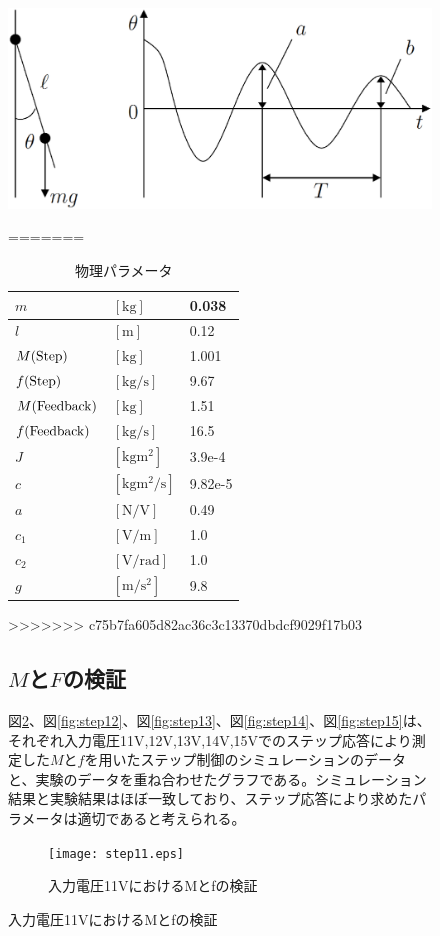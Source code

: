 \documentclass[a4j,11pt,twoside]{ujbook}
\begin{document}
\begin{figure}[htbp]
	\begin{center}
		\includegraphics[width = 0.7 \linewidth]{measure_jc.eps}
		\caption{振子の自由振動}
		\label{fig:振子の自由振動}
=======
\begin{table}[hbtp]
	\begin{center}
		\caption{物理パラメータ}
		\medskip
		\begin{tabular}{|ll|l|} \hline
			$m$ & $[\mathrm{kg}]$ & 0.038 \\ \hline
			$l$ & $[\mathrm{m}]$ & 0.12 \\ \hline
			$M(\rm{Step})$ & $[\mathrm{kg}]$ & 1.001 \\ \hline
			$f(\rm{Step})$ & $[\mathrm{kg/s}]$ & 9.67 \\ \hline
			$M(\rm{Feedback})$ & $[\mathrm{kg}]$ & 1.51 \\ \hline
			$f(\rm{Feedback})$ & $[\mathrm{kg/s}]$ & 16.5 \\ \hline
			$J$ & $[\mathrm{kgm^2}]$ & 3.9e-4 \\ \hline
			$c$ & $[\mathrm{kgm^2/s}]$ & 9.82e-5 \\ \hline
			$a$ & $[\mathrm{N/V}]$ & 0.49 \\ \hline
			$c_1$ & $[\mathrm{V/m}]$ & 1.0 \\ \hline
			$c_2$ & $[\mathrm{V/rad}]$ & 1.0 \\ \hline
			$g$ & $[\mathrm{m/s^2}]$ & 9.8 \\ \hline
		\end{tabular}
>>>>>>> c75b7fa605d82ac36c3c13370dbdcf9029f17b03
	\end{center}
\end{table}

	\subsection{$M$と$F$の検証}

	図\ref{fig:step11}、図\ref{fig:step12}、図\ref{fig:step13}、図\ref{fig:step14}、図\ref{fig:step15}は、それぞれ入力電圧11V,12V,13V,14V,15Vでのステップ応答により測定した$M$と$f$を用いたステップ制御のシミュレーションのデータと、実験のデータを重ね合わせたグラフである。シミュレーション結果と実験結果はほぼ一致しており、ステップ応答により求めたパラメータは適切であると考えられる。
 \clearpage
	\begin{figure}[htbp]
		\begin{center}
			\texttt{[image: step11.eps]}
			\caption{入力電圧11VにおけるMとfの検証}
			\label{fig:step11}
		\end{center}
	\end{figure}


\end{center}
\end{figure}
\end{document}
